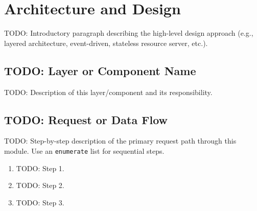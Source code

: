 \section{Architecture and Design}
%
%
TODO: Introductory paragraph describing the high-level design approach
(e.g., layered architecture, event-driven, stateless resource server, etc.).

\subsection{TODO: Layer or Component Name}

TODO: Description of this layer/component and its responsibility.

\subsection{TODO: Request or Data Flow}

TODO: Step-by-step description of the primary request path through this module.
Use an \texttt{enumerate} list for sequential steps.

\begin{enumerate}
  \item TODO: Step 1.
  \item TODO: Step 2.
  \item TODO: Step 3.
\end{enumerate}

%

